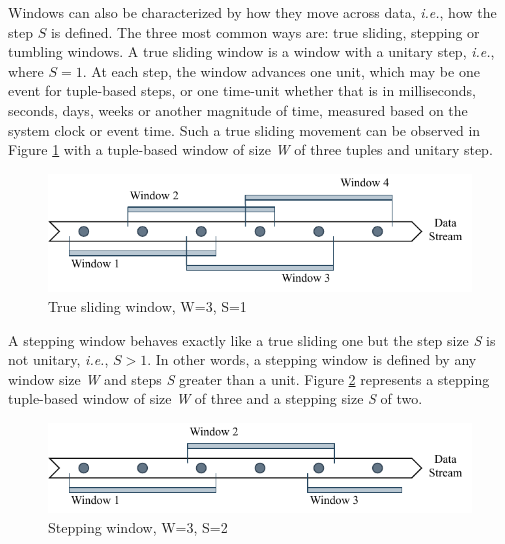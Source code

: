 Windows can also be characterized by how they move across data, \textit{i.e.}, how the step $S$ is defined. The three most common ways are: true sliding, stepping or tumbling windows. A true sliding window is a window with a unitary step, \textit{i.e.}, where $S = 1$. At each step, the window advances one unit, which may be one event for tuple-based steps, or one time-unit whether that is in milliseconds, seconds, days, weeks or another magnitude of time, measured based on the system clock or event time. Such a true sliding movement can be observed in Figure \ref{fig:sliding-window} with a tuple-based window of size \textit{W} of three tuples and unitary step. 

\begin{figure}[!htb]
    \begin{center}
      \includegraphics[scale=1.1]{figures/sliding.pdf}
      \caption[True sliding window]{True sliding window, W=3, S=1}
      \label{fig:sliding-window} 
    \end{center}
\end{figure} 

A stepping window behaves exactly like a true sliding one but the step size \textit{S} is not unitary, \textit{i.e.}, $S > 1$. In other words, a stepping window is defined by any window size \textit{W} and steps \textit{S} greater than a unit. Figure \ref{fig:stepping-window} represents a stepping tuple-based window of size \textit{W} of three and a stepping size \textit{S} of two.

\begin{figure}[!htb]
    \begin{center}
      \includegraphics[scale=1.1]{figures/stepping.pdf}
      \caption[Stepping window]{Stepping window, W=3, S=2}
      \label{fig:stepping-window}
    \end{center}
\end{figure}


